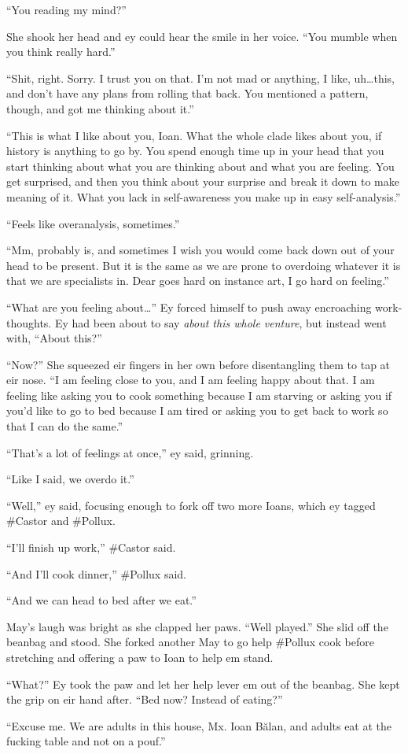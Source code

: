 ``You reading my mind?''

She shook her head and ey could hear the smile in her voice. ``You mumble when you think really hard.''

``Shit, right. Sorry. I trust you on that. I'm not mad or anything, I like, uh\ldots this, and don't have any plans from rolling that back. You mentioned a pattern, though, and got me thinking about it.''

``This is what I like about you, Ioan. What the whole clade likes about you, if history is anything to go by. You spend enough time up in your head that you start thinking about what you are thinking about and what you are feeling. You get surprised, and then you think about your surprise and break it down to make meaning of it. What you lack in self-awareness you make up in easy self-analysis.''

``Feels like overanalysis, sometimes.''

``Mm, probably is, and sometimes I wish you would come back down out of your head to be present. But it is the same as we are prone to overdoing whatever it is that we are specialists in. Dear goes hard on instance art, I go hard on feeling.''

``What are you feeling about\ldots{}'' Ey forced himself to push away encroaching work-thoughts. Ey had been about to say \emph{about this whole venture}, but instead went with, ``About this?''

``Now?'' She squeezed eir fingers in her own before disentangling them to tap at eir nose. ``I am feeling close to you, and I am feeling happy about that. I am feeling like asking you to cook something because I am starving or asking you if you'd like to go to bed because I am tired or asking you to get back to work so that I can do the same.''

``That's a lot of feelings at once,'' ey said, grinning.

``Like I said, we overdo it.''

``Well,'' ey said, focusing enough to fork off two more Ioans, which ey tagged \#Castor and \#Pollux.

``I'll finish up work,'' \#Castor said.

``And I'll cook dinner,'' \#Pollux said.

``And we can head to bed after we eat.''

May's laugh was bright as she clapped her paws. ``Well played.'' She slid off the beanbag and stood. She forked another May to go help \#Pollux cook before stretching and offering a paw to Ioan to help em stand.

``What?'' Ey took the paw and let her help lever em out of the beanbag. She kept the grip on eir hand after. ``Bed now? Instead of eating?''

``Excuse me. We are adults in this house, Mx. Ioan Bălan, and adults eat at the fucking table and not on a pouf.''
